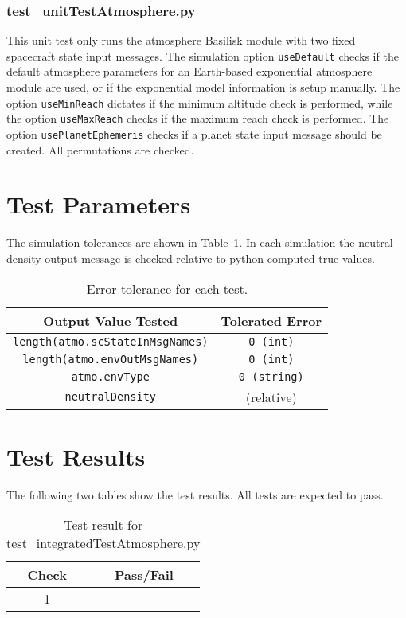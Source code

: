 \subsubsection{test\_unitTestAtmosphere.py}
This unit test only runs the atmosphere Basilisk module with two fixed spacecraft state input messages.  The simulation option {\tt useDefault} checks if the default atmosphere parameters for an Earth-based exponential atmosphere module are used, or if the exponential model information is setup manually.  The option {\tt useMinReach} dictates if the minimum altitude check is performed, while the option {\tt useMaxReach} checks if the maximum reach check is performed.  The option {\tt usePlanetEphemeris} checks if a planet state input message should be created.  All permutations are checked.

\section{Test Parameters}
The simulation tolerances are shown in Table~\ref{tab:errortol}.  In each simulation the neutral density output message is checked relative to python computed true values.  
\begin{table}[htbp]
	\caption{Error tolerance for each test.}
	\label{tab:errortol}
	\centering \fontsize{10}{10}\selectfont
	\begin{tabular}{ c | c } %
		\hline\hline
		\textbf{Output Value Tested}  & \textbf{Tolerated Error}  \\ 
		\hline
		{\tt length(atmo.scStateInMsgNames)}        & {\tt 0 (int)}   \\
		{\tt length(atmo.envOutMsgNames)}        & {\tt 0 (int)}   \\ 
		{\tt atmo.envType}        & {\tt 0 (string)}   \\ 
		{\tt neutralDensity}        &  (relative) \\ 
		\hline\hline
	\end{tabular}
\end{table}




\section{Test Results}
The following two tables show the test results.  All tests are expected to pass.


\begin{table}[H]
	\caption{Test result for test\_integratedTestAtmosphere.py}
	\label{tab:results}
	\centering \fontsize{10}{10}\selectfont
	\begin{tabular}{c  | c } %
		\hline\hline
		\textbf{Check} &  \textbf{Pass/Fail} \\ 
		\hline
		1 &   \\ 
		\hline
		\hline
	\end{tabular}
\end{table}


